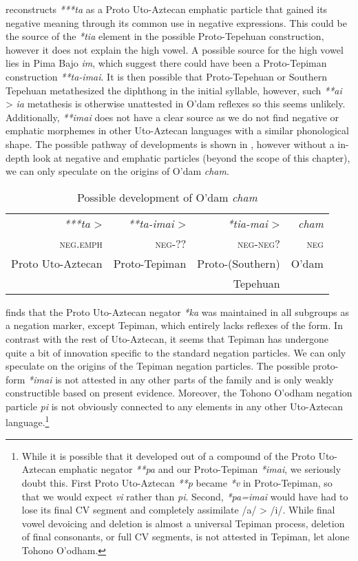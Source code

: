 \documentclass[output=paper]{langsci/langscibook}
\begin{document}
\citet[33]{langacker1977} reconstructs \emph{***ta} as a Proto Uto-Aztecan emphatic particle that gained its negative meaning through its common use in negative expressions. This could be the source of the \emph{*tia} element in the possible Proto-Tepehuan construction, however it does not explain the high vowel. A possible source for the high vowel lies in Pima Bajo \emph{im}, which suggest there could have been a Proto-Tepiman construction \emph{**ta-imai}. It is then possible that Proto-Tepehuan or Southern Tepehuan metathesized the diphthong in the initial syllable, however, such \emph{**ai} > \emph{ia} metathesis is otherwise unattested in O’dam reflexes so this seems unlikely. Additionally, \emph{**imai} does not have a clear source as we do not find negative or emphatic morphemes in other Uto-Aztecan languages with a similar phonological shape. The possible pathway of developments is shown in , however without a in-depth look at negative and emphatic particles (beyond the scope of this chapter), we can only speculate on the origins of O’dam \emph{cham}.
\begin{table}
\caption{Possible development of O'dam \emph{cham}}
\label{tab:odam-pathchange}
 \begin{tabular}{rrrr} 
\emph{***ta} >	&	\emph{**ta-imai}	>	&	\emph{*tia-mai}	>	&	\emph{cham}\\
\textsc{neg.emph}	&	\textsc{neg}-??	&	\textsc{neg-neg?}	&	\textsc{neg}\\
Proto Uto-Aztecan	&	Proto-Tepiman	&	Proto-(Southern)	&		O’dam\\
& & Tepehuan & \\
\end{tabular}
\end{table}

\citet{hill2014} finds that the Proto Uto-Aztecan negator \emph{*ka} was maintained in all subgroups as a negation marker, except Tepiman, which entirely lacks reflexes of the form. In contrast with the rest of Uto-Aztecan, it seems that Tepiman has undergone quite a bit of innovation specific to the standard negation particles. We can only speculate on the origins of the Tepiman negation particles. The possible proto-form \emph{*imai} is not attested in any other parts of the family and is only weakly constructible based on present evidence. Moreover, the Tohono O'odham negation particle \emph{pi} is not obviously connected to any  elements in any other Uto-Aztecan language.\footnote{While it is possible that it developed out of a compound of the Proto Uto-Aztecan emphatic negator \emph{**pa} and our Proto-Tepiman \emph{*imai}, we seriously doubt this. First Proto Uto-Aztecan \emph{**p} became \emph{*v} in Proto-Tepiman, so that we would expect \emph{vi} rather than \emph{pi}. Second, \emph{*pa=imai} would have had to lose its final CV segment and completely assimilate /a/ > /i/. While final vowel devoicing and deletion is almost a universal Tepiman process, deletion of final consonants, or full CV segments, is not attested in Tepiman, let alone Tohono O'odham.} 
\end{document}
